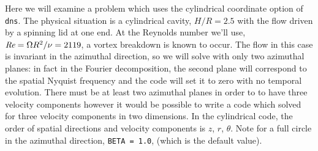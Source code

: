 \documentclass[11pt,a4paper]{report}
\def\Rey{\mbox{\it Re}}                             %
\begin{document}
Here we will examine a problem which uses the cylindrical coordinate
option of \verb+dns+.  The physical situation is a cylindrical cavity,
$H/R=2.5$ with the flow driven by a spinning lid at one end.  At the
Reynolds number we'll use, $\Rey=\Omega R^2/\nu=2119$, a vortex
breakdown is known to occur.  The flow in this case is invariant in
the azimuthal direction, so we will solve with only two azimuthal
planes: in fact in the Fourier decomposition, the second plane will
correspond to the spatial Nyquist frequency and the code will set it
to zero with no temporal evolution.  There must be at least two
azimuthal planes in order to to have three velocity components however
it would be possible to write a code which solved for three velocity
components in two dimensions.  In the cylindrical code, the order of
spatial directions and velocity components is $z$, $r$, $\theta$.
Note for a full circle in the azimuthal direction, \texttt{BETA =
1.0}, (which is the default value).
\end{document}

